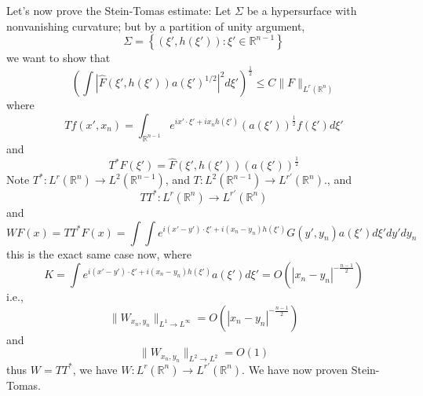 \documentclass[openany]{book}
\newcommand{\R}{\mathbb{R}}
\begin{document}
Let's now prove the Stein-Tomas estimate:
Let $\Sigma$ be a hypersurface with nonvanishing curvature; but by a partition of unity argument, 
\begin{equation*}
    \Sigma=\left\{(\xi', h(\xi')):\xi'\in\R^{n-1}\right\}
\end{equation*}
we want to show that 
\begin{equation*}
    \left(\int|\hat{F}(\xi', h(\xi'))a(\xi')^{1/2}|^2d\xi'\right)^\frac{1}{2}\leq C\|F\|_{L^r(\R^n)}
\end{equation*}
where 
\begin{equation*}
    Tf(x',x_n)=\int_{\R^{n-1}}e^{ix'\cdot\xi'+ix_nh(\xi')}(a(\xi'))^\frac{1}{2}f(\xi')d\xi'
\end{equation*}
and 
\begin{equation*}
    T^*F(\xi')=\hat{F}(\xi',h(\xi'))(a(\xi'))^\frac{1}{2}
\end{equation*}
Note $T^*: L^r(\R^n)\to L^2(\R^{n-1})$, and $T:L^2(\R^{n-1})\to L^{r'}(\R^n)$., and 
\begin{equation*}
    TT^*: L^r(\R^n)\to L^{r'}(\R^n)
\end{equation*}
and 
\begin{equation*}
    WF(x)=TT^*F(x)=\int\int e^{i(x'-y')\cdot\xi'+i(x_n-y_n)h(\xi')}G(y', y_n)a(\xi')d\xi'dy'dy_n
\end{equation*}
this is the exact same case now, where 
\begin{equation*}
    K=\int e^{i(x'-y')\cdot\xi'+i(x_n-y_n)h(\xi')}a(\xi')d\xi'=O(|x_n-y_n|^{-\frac{n-1}{2}})
\end{equation*}
i.e., 
\begin{equation*}
    \|W_{x_n,y_n}\|_{L^1\to L^\infty}=O(|x_n-y_n|^{-\frac{n-1}{2}})
\end{equation*}
and 
\begin{equation*}
    \|W_{x_n,y_n}\|_{L^2\to L^2}=O(1)
\end{equation*}
thus $W=TT^*$, we have $W: L^r(\R^n)\to L^{r'}(\R^n)$. We have now proven Stein-Tomas.
\end{document}
